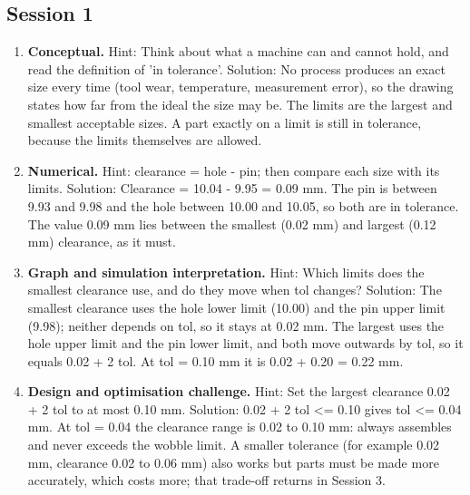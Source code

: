 \documentclass[11pt,a4paper]{article}
\begin{document}
\subsection*{Session 1}
\begin{enumerate}[nosep]
\item \textbf{Conceptual.} Hint: Think about what a machine can and cannot hold, and read the definition of 'in tolerance'. Solution: No process produces an exact size every time (tool wear, temperature, measurement error), so the drawing states how far from the ideal the size may be. The limits are the largest and smallest acceptable sizes. A part exactly on a limit is still in tolerance, because the limits themselves are allowed.
\item \textbf{Numerical.} Hint: clearance = hole - pin; then compare each size with its limits. Solution: Clearance = 10.04 - 9.95 = 0.09 mm. The pin is between 9.93 and 9.98 and the hole between 10.00 and 10.05, so both are in tolerance. The value 0.09 mm lies between the smallest (0.02 mm) and largest (0.12 mm) clearance, as it must.
\item \textbf{Graph and simulation interpretation.} Hint: Which limits does the smallest clearance use, and do they move when tol changes? Solution: The smallest clearance uses the hole lower limit (10.00) and the pin upper limit (9.98); neither depends on tol, so it stays at 0.02 mm. The largest uses the hole upper limit and the pin lower limit, and both move outwards by tol, so it equals 0.02 + 2 tol. At tol = 0.10 mm it is 0.02 + 0.20 = 0.22 mm.
\item \textbf{Design and optimisation challenge.} Hint: Set the largest clearance 0.02 + 2 tol to at most 0.10 mm. Solution: 0.02 + 2 tol \textless{}= 0.10 gives tol \textless{}= 0.04 mm. At tol = 0.04 the clearance range is 0.02 to 0.10 mm: always assembles and never exceeds the wobble limit. A smaller tolerance (for example 0.02 mm, clearance 0.02 to 0.06 mm) also works but parts must be made more accurately, which costs more; that trade-off returns in Session 3.
\end{enumerate}
\end{document}
